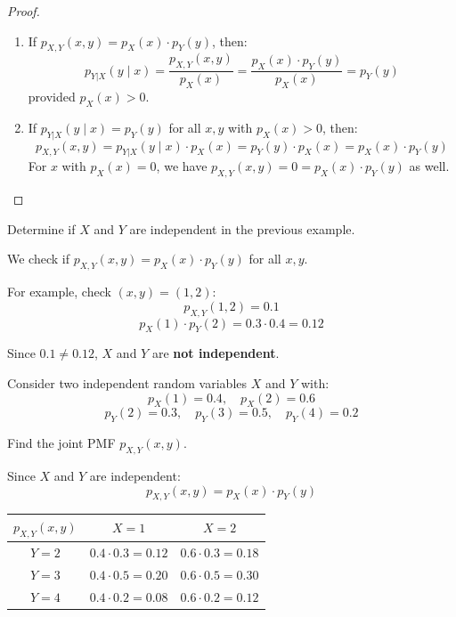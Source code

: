 \begin{proof}
\begin{enumerate}[label=(\alph*)]
    \item If $p_{X,Y}(x, y) = p_X(x) \cdot p_Y(y)$, then:
    \[
    p_{Y|X}(y \mid x) = \frac{p_{X,Y}(x, y)}{p_X(x)} = \frac{p_X(x) \cdot p_Y(y)}{p_X(x)} = p_Y(y)
    \]
    provided $p_X(x) > 0$.
    
    \item If $p_{Y|X}(y \mid x) = p_Y(y)$ for all $x, y$ with $p_X(x) > 0$, then:
    \[
    p_{X,Y}(x, y) = p_{Y|X}(y \mid x) \cdot p_X(x) = p_Y(y) \cdot p_X(x) = p_X(x) \cdot p_Y(y)
    \]
    For $x$ with $p_X(x) = 0$, we have $p_{X,Y}(x, y) = 0 = p_X(x) \cdot p_Y(y)$ as well.
\end{enumerate}
\end{proof}

\begin{eg}
Determine if $X$ and $Y$ are independent in the previous example.

\begin{solution}
We check if $p_{X,Y}(x, y) = p_X(x) \cdot p_Y(y)$ for all $x, y$.

For example, check $(x, y) = (1, 2)$:
\[
p_{X,Y}(1, 2) = 0.1
\]
\[
p_X(1) \cdot p_Y(2) = 0.3 \cdot 0.4 = 0.12
\]

Since $0.1 \neq 0.12$, $X$ and $Y$ are \textbf{not independent}.
\end{solution}
\end{eg}

\begin{eg}
Consider two independent random variables $X$ and $Y$ with:
\[
p_X(1) = 0.4, \quad p_X(2) = 0.6
\]
\[
p_Y(2) = 0.3, \quad p_Y(3) = 0.5, \quad p_Y(4) = 0.2
\]

Find the joint PMF $p_{X,Y}(x, y)$.

\begin{solution}
Since $X$ and $Y$ are independent:
\[
p_{X,Y}(x, y) = p_X(x) \cdot p_Y(y)
\]

\begin{center}
\renewcommand{\arraystretch}{1.5}
\begin{tabular}{c|cc}
$p_{X,Y}(x,y)$ & $X=1$ & $X=2$ \\ \hline
$Y=2$ & $0.4 \cdot 0.3 = 0.12$ & $0.6 \cdot 0.3 = 0.18$ \\
$Y=3$ & $0.4 \cdot 0.5 = 0.20$ & $0.6 \cdot 0.5 = 0.30$ \\
$Y=4$ & $0.4 \cdot 0.2 = 0.08$ & $0.6 \cdot 0.2 = 0.12$ \\
\end{tabular}
\end{center}
\end{solution}
\end{eg}


